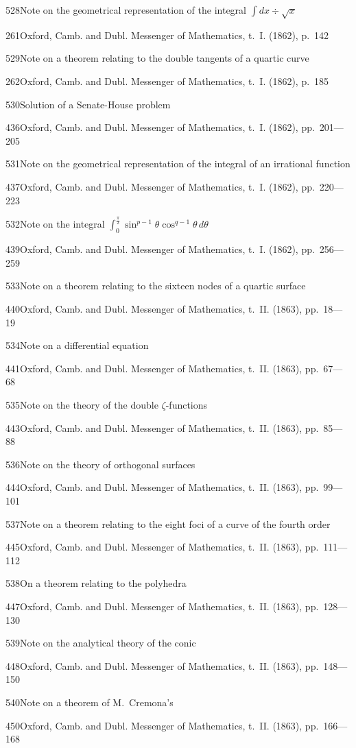 \documentclass[11pt,a4paper]{book}
\providecommand{\tocentry}[2]{#1\dotfill #2\par}
\begin{document}
\tocentry{528}{Note on the geometrical representation of the integral $\int dx \div \sqrt{x}$}{261}{Oxford, Camb. and Dubl. Messenger of Mathematics, t.~I. (1862), p.~142}

\tocentry{529}{Note on a theorem relating to the double tangents of a quartic curve}{262}{Oxford, Camb. and Dubl. Messenger of Mathematics, t.~I. (1862), p.~185}

\tocentry{530}{Solution of a Senate-House problem}{436}{Oxford, Camb. and Dubl. Messenger of Mathematics, t.~I. (1862), pp.~201---205}

\newpage

\tocentry{531}{Note on the geometrical representation of the integral of an irrational function}{437}{Oxford, Camb. and Dubl. Messenger of Mathematics, t.~I. (1862), pp.~220---223}

\tocentry{532}{Note on the integral $\int_0^{\frac{\pi}{2}} \sin^{p-1}\theta \cos^{q-1}\theta\, d\theta$}{439}{Oxford, Camb. and Dubl. Messenger of Mathematics, t.~I. (1862), pp.~256---259}

\tocentry{533}{Note on a theorem relating to the sixteen nodes of a quartic surface}{440}{Oxford, Camb. and Dubl. Messenger of Mathematics, t.~II. (1863), pp.~18---19}

\tocentry{534}{Note on a differential equation}{441}{Oxford, Camb. and Dubl. Messenger of Mathematics, t.~II. (1863), pp.~67---68}

\tocentry{535}{Note on the theory of the double $\zeta$-functions}{443}{Oxford, Camb. and Dubl. Messenger of Mathematics, t.~II. (1863), pp.~85---88}

\tocentry{536}{Note on the theory of orthogonal surfaces}{444}{Oxford, Camb. and Dubl. Messenger of Mathematics, t.~II. (1863), pp.~99---101}

\tocentry{537}{Note on a theorem relating to the eight foci of a curve of the fourth order}{445}{Oxford, Camb. and Dubl. Messenger of Mathematics, t.~II. (1863), pp.~111---112}

\tocentry{538}{On a theorem relating to the polyhedra}{447}{Oxford, Camb. and Dubl. Messenger of Mathematics, t.~II. (1863), pp.~128---130}

\tocentry{539}{Note on the analytical theory of the conic}{448}{Oxford, Camb. and Dubl. Messenger of Mathematics, t.~II. (1863), pp.~148---150}

\tocentry{540}{Note on a theorem of M.~Cremona's}{450}{Oxford, Camb. and Dubl. Messenger of Mathematics, t.~II. (1863), pp.~166---168}
\end{document}
